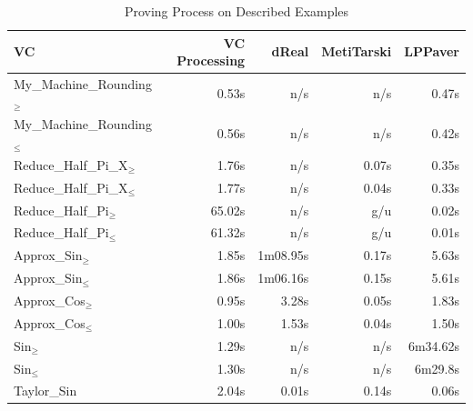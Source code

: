 \documentclass[runningheads]{llncs}
\begin{document}
\begin{table}[tb]
  \caption{Proving Process on Described Examples}
  \label{table:benchmarks}
  \centering
  \begin{tabular}{l@{\kern1em}r@{\kern1em}r@{\kern1em}r@{\kern1em}r}
  \toprule %
  VC                         & VC Processing & dReal     & MetiTarski  & LPPaver \\
  \midrule
  My\_Machine\_Rounding${}_\ge$    & 0.53s   & n/s       & n/s         & 0.47s \\
  My\_Machine\_Rounding${}_\le$    & 0.56s   & n/s       & n/s         & 0.42s \\
  Reduce\_Half\_Pi\_X${}_\ge$      & 1.76s   & n/s       & 0.07s       & 0.35s \\
  Reduce\_Half\_Pi\_X${}_\le$      & 1.77s   & n/s       & 0.04s       & 0.33s \\
  Reduce\_Half\_Pi${}_\ge$         & 65.02s  & n/s       & g/u         & 0.02s \\
  Reduce\_Half\_Pi${}_\le$         & 61.32s  & n/s       & g/u         & 0.01s \\
  Approx\_Sin${}_\ge$              & 1.85s   & 1m08.95s  & 0.17s       & 5.63s \\
  Approx\_Sin${}_\le$              & 1.86s   & 1m06.16s  & 0.15s       & 5.61s \\
  Approx\_Cos${}_\ge$              & 0.95s   & 3.28s     & 0.05s       & 1.83s \\
  Approx\_Cos${}_\le$              & 1.00s   & 1.53s     & 0.04s       & 1.50s \\
  Sin${}_\ge$                      & 1.29s   & n/s       & n/s         & 6m34.62s \\ 
  Sin${}_\le$                      & 1.30s   & n/s       & n/s         & 6m29.8s \\ 
  Taylor\_Sin                      & 2.04s   & 0.01s     & 0.14s       & 0.06s \\

\end{tabular}
\end{table}
\end{document}
